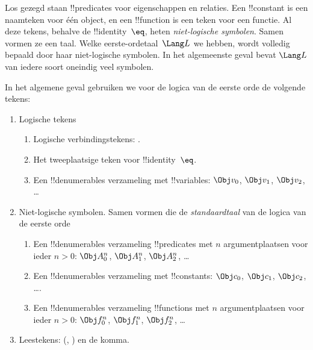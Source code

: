 \documentclass[openany]{memoir}
\begin{document}
\begin{explain}
Los gezegd staan !!{predicate}s voor eigenschappen en relaties. Een
!!{constant} is een naamteken voor één object, en een !!{function} is
een teken voor een functie. Al deze tekens, behalve de
!!{identity}~$\eq$, heten \emph{niet-logische symbolen}. Samen vormen ze
een taal. Welke eerste-ordetaal~$\Lang L$ we hebben, wordt volledig
bepaald door haar niet-logische symbolen. In het algemeenste geval
bevat $\Lang L$ van iedere soort oneindig veel symbolen.
\end{explain}

In het algemene geval gebruiken we voor de logica van de eerste orde
de volgende tekens:

\begin{enumerate}
\item Logische tekens
\begin{enumerate}
\item Logische verbindingstekens:
  \startycommalist
  .
\item Het tweeplaatsige teken voor !!{identity}~$\eq$.
\item Een !!{denumerable}s verzameling met !!{variable}s: $\Obj v_0$, $\Obj v_1$, $\Obj
  v_2$, \dots
\end{enumerate}
\item Niet-logische symbolen. Samen vormen die de \emph{standaardtaal}
  van de logica van de eerste orde
\begin{enumerate}
\item Een !!{denumerable}s verzameling !!{predicate}s met $n$ argumentplaatsen voor ieder $n>0$: $\Obj
  A^n_0$, $\Obj A^n_1$, $\Obj A^n_2$, \dots
\item Een !!{denumerable}s verzameling met !!{constant}s: $\Obj c_0$, $\Obj c_1$, $\Obj
  c_2$, \dots.
\item Een !!{denumerable}s verzameling !!{function}s met $n$ argumentplaatsen voor ieder $n>0$:
  $\Obj f^n_0$, $\Obj f^n_1$, $\Obj f^n_2$, \dots
\end{enumerate}
\item Leestekens: (, ) en de komma.
\end{enumerate}
\end{document}

